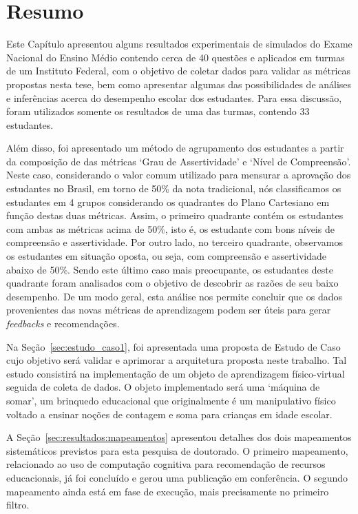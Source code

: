 \newpage
\section{Resumo}
\label{summary:PartialResults}

Este Capítulo apresentou alguns resultados experimentais de simulados do Exame Nacional do Ensino Médio contendo cerca de 40 questões e aplicados em turmas de um Instituto Federal, com o objetivo de coletar dados para validar as métricas propostas nesta tese, bem como apresentar algumas das possibilidades de análises e inferências acerca do desempenho escolar dos estudantes. Para essa discussão, foram utilizados somente os resultados de uma das turmas, contendo 33 estudantes.

Além disso, foi apresentado um método de agrupamento dos estudantes a partir da composição de das métricas `Grau de Assertividade' e `Nível de Compreensão'. Neste caso, considerando o valor comum utilizado para mensurar a aprovação dos estudantes no Brasil, em torno de 50\% da nota tradicional, nós classificamos os estudantes em 4 grupos considerando os quadrantes do Plano Cartesiano em função destas duas métricas. Assim, o primeiro quadrante contém os estudantes com ambas as métricas acima de 50\%, isto é, os estudante com bons níveis de compreensão e assertividade. Por outro lado, no terceiro quadrante, observamos os estudantes em situação oposta, ou seja, com compreensão e assertividade abaixo de 50\%. Sendo este último caso mais preocupante, os estudantes deste quadrante foram analisados com o objetivo de descobrir as razões de seu baixo desempenho. De um modo geral, esta análise nos permite concluir que os dados provenientes das novas métricas de aprendizagem podem ser úteis para gerar \textit{feedbacks} e recomendações.

Na Seção~\ref{sec:estudo_caso1}, foi apresentada uma proposta de Estudo de Caso cujo objetivo será validar e aprimorar a arquitetura proposta neste trabalho. Tal estudo consistirá na implementação de um objeto de aprendizagem físico-virtual seguida de coleta de dados. O objeto implementado será uma `máquina de somar', um brinquedo educacional que originalmente é um manipulativo físico voltado a ensinar noções de contagem e soma para crianças em idade escolar.

A Seção~\ref{sec:resultados:mapeamentos} apresentou detalhes dos dois mapeamentos sistemáticos previstos para esta pesquisa de doutorado. O primeiro mapeamento, relacionado ao uso de computação cognitiva para recomendação de recursos educacionais, já foi concluído e gerou uma publicação em conferência. O segundo mapeamento ainda está em fase de execução, mais precisamente no primeiro filtro.

